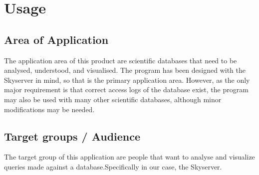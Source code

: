\section{Usage}
\subsection{Area of Application}
The application area of this product are scientific databases that need to be analysed,
 understood, and visualised.
The program has been designed with the Skyserver in mind,
 so that is the primary application area.
However, as the only major requirement is that correct access logs of the database exist,
the program may also be used with many other scientific databases,
 although minor modifications may be needed.


%



\subsection{Target groups / Audience}

The target group of this application are people that want to analyse 
and visualize queries made against a database.Specifically
in our case, the Skyserver.

